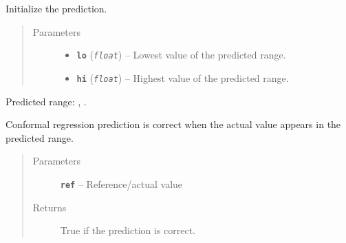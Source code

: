 \documentclass[letterpaper,10pt,english]{sphinxmanual}
\begin{document}
\begin{fulllineitems}
\begin{fulllineitems}
\label{cp.regression:cp.regression.PredictionRegr.__init__}
Initialize the prediction.
\begin{quote}\begin{description}
\item[{Parameters}] \leavevmode\begin{itemize}
\item {} 
\textbf{\texttt{lo}} (\emph{\texttt{float}}) -- Lowest value of the predicted range.

\item {} 
\textbf{\texttt{hi}} (\emph{\texttt{float}}) -- Highest value of the predicted range.

\end{itemize}

\end{description}\end{quote}

\end{fulllineitems}


\begin{fulllineitems}
\label{cp.regression:cp.regression.PredictionRegr.range}
Predicted range: {\hyperref[cp.regression:cp.regression.PredictionRegr.lo]{}}, {\hyperref[cp.regression:cp.regression.PredictionRegr.hi]{}}.

\end{fulllineitems}


\begin{fulllineitems}
\label{cp.regression:cp.regression.PredictionRegr.verdict}
Conformal regression prediction is correct when the actual value appears
in the predicted range.
\begin{quote}\begin{description}
\item[{Parameters}] \leavevmode
\textbf{\texttt{ref}} -- Reference/actual value

\item[{Returns}] \leavevmode
True if the prediction is correct.

\end{description}\end{quote}


\end{fulllineitems}
\end{fulllineitems}
\end{document}
